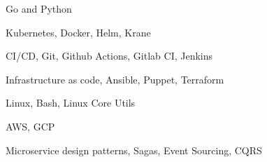 \item Go and Python
\item Kubernetes, Docker, Helm, Krane
\item CI/CD, Git, Github Actions, Gitlab CI, Jenkins
\item Infrastructure as code, Ansible, Puppet, Terraform
\item Linux, Bash, Linux Core Utils
\item AWS, GCP
\item Microservice design patterns, Sagas, Event Sourcing, CQRS
